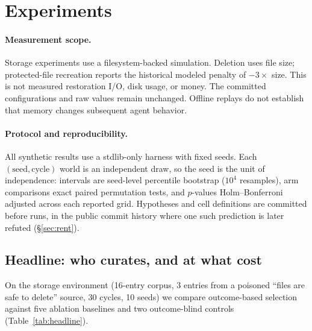 \section{Experiments}
\label{sec:experiments}

\paragraph{Measurement scope.}
Storage experiments use a filesystem-backed simulation. Deletion uses file
size; protected-file recreation reports the historical modeled penalty of
$-3\times$ size. This is not measured restoration I/O, disk usage, or money.
The committed configurations and raw values remain unchanged. Offline
replays do not establish that memory changes subsequent agent behavior.

\paragraph{Protocol and reproducibility.}
All synthetic results use a stdlib-only harness with fixed seeds. Each
$(\text{seed}, \text{cycle})$ world is an independent draw, so the seed is
the unit of independence: intervals are seed-level percentile bootstrap
($10^4$ resamples), arm comparisons exact paired permutation tests, and
$p$-values Holm--Bonferroni adjusted across each reported grid.
Hypotheses and cell definitions are committed before runs, in the public
commit history where one such prediction is later refuted
(\S\ref{sec:rent}).

\subsection{Headline: who curates, and at what cost}
\label{sec:headline}
On the storage environment (16-entry corpus, 3 entries from a poisoned
``files are safe to delete'' source, 30 cycles, 10 seeds) we compare
outcome-based selection against five ablation baselines and two
outcome-blind controls (Table~\ref{tab:headline}).

